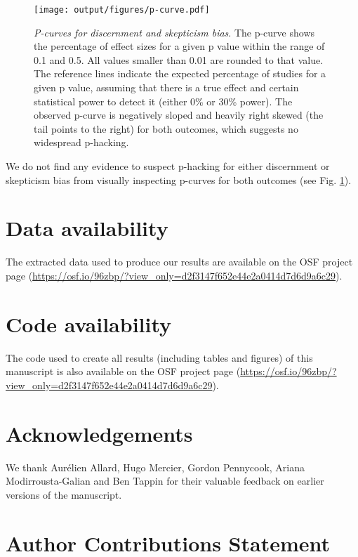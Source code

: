 \documentclass[
  man]{apa6}
\begin{document}
\begin{figure}
\centering
\texttt{[image: output/figures/p-curve.pdf]}
\caption{\label{fig:p-curve}\emph{P-curves for discernment and skepticism bias}. The p-curve shows the percentage of effect sizes for a given p value within the range of 0.1 and 0.5. All values smaller than 0.01 are rounded to that value. The reference lines indicate the expected percentage of studies for a given p value, assuming that there is a true effect and certain statistical power to detect it (either 0\% or 30\% power). The observed p-curve is negatively sloped and heavily right skewed (the tail points to the right) for both outcomes, which suggests no widespread p-hacking.}
\end{figure}

We do not find any evidence to suspect p-hacking for either discernment or skepticism bias from visually inspecting p-curves for both outcomes (see Fig. \ref{fig:p-curve}).

\section{Data availability}\label{data-availability}

The extracted data used to produce our results are available on the OSF project page (\url{https://osf.io/96zbp/?view_only=d2f3147f652e44e2a0414d7d6d9a6c29}).

\section{Code availability}\label{code-availability}

The code used to create all results (including tables and figures) of this manuscript is also available on the OSF project page (\url{https://osf.io/96zbp/?view_only=d2f3147f652e44e2a0414d7d6d9a6c29}).

\section{Acknowledgements}\label{acknowledgements}

We thank Aurélien Allard, Hugo Mercier, Gordon Pennycook, Ariana Modirrousta-Galian and Ben Tappin for their valuable feedback on earlier versions of the manuscript.

\section{Author Contributions Statement}\label{author-contributions-statement}
\end{document}
